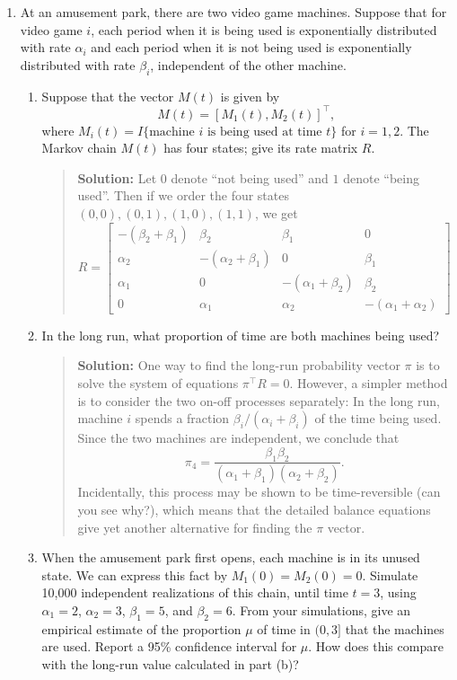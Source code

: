 \documentclass{article}
\begin{document}
\begin{enumerate}
  \item At an amusement park, there are two video game machines. Suppose that
  for video game $i$, each period when it is being used is exponentially
  distributed with rate $\alpha_i$ and each period when it is not being used is
  exponentially distributed with rate $\beta_i$, independent of the other
  machine.
  
    \begin{enumerate}

    \item Suppose that the vector $M(t)$ is given by
    \[
    M(t) = [ M_1(t), M_2(t) ] ^\top,
    \]
    where $M_i(t)=I\{\mbox{machine $i$ is being used at time $t$}\}$ for $i=1,
    2$. The Markov chain $M(t)$ has four states; give its rate matrix $R$.
    \begin{quotation}{\bf Solution:}
    Let $0$ denote ``not being used'' and $1$ denote ``being used''.  Then
    if we order the four states $(0,0), (0,1), (1,0), (1,1)$, we get
    \[
    R = 
    \begin{bmatrix}
    -(\beta_2+\beta_1) & \beta_2 & \beta_1 & 0 \\
    \alpha_2 & -(\alpha_2+\beta_1) & 0 & \beta_1 \\
    \alpha_1 & 0 & -(\alpha_1+\beta_2) & \beta_2 \\
    0 & \alpha_1 & \alpha_2 & -(\alpha_1+\alpha_2)
    \end{bmatrix}
    \]
    \end{quotation}
    
    \item In the long run, what proportion of time are both machines being used?
    \begin{quotation}{\bf Solution:}
    One way to find the long-run probability vector $\pi$ 
    is to solve the system of equations
    $\pi^\top R=0$.  
    However, a simpler method is to consider the two on-off processes separately:
    In the long run, machine $i$ spends a fraction $\beta_i/(\alpha_i+\beta_i)$ of
    the time being used.  Since the two machines are independent, we conclude that
    \[
    \pi_4 = \frac{\beta_1\beta_2}{(\alpha_1+\beta_1)(\alpha_2+\beta_2)}.
    \]
    Incidentally, this process may be shown to be time-reversible (can you
    see why?), which means that the detailed balance equations give yet
    another alternative for finding the $\pi$ vector.
    \end{quotation}
    
    \item When the amusement park first opens, each machine is in its unused
    state. We can express this fact by $M_1(0)=M_2(0)=0$. Simulate 10,000
    independent realizations of this chain, until time $t=3$, using
    $\alpha_1=2$, $\alpha_2=3$, $\beta_1=5$, and $\beta_2=6$. From your
    simulations, give an empirical estimate of the proportion $\mu$ of time in
    $(0, 3]$ that the machines are used. Report a 95\% confidence interval for
    $\mu$. How does this compare with the long-run value calculated in part (b)?


\end{enumerate}
\end{enumerate}
\end{document}
